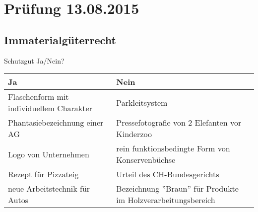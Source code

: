 \section{Prüfung 13.08.2015}

\subsection{Immaterialgüterrecht}
Schutzgut Ja/Nein?\\
\begin{tabular}{|l|l|}
	\hline 
	\textbf{Ja} & \textbf{Nein} \\ 
	\hline 
	Flaschenform mit individuellem Charakter & Parkleitsystem \\ 
	\hline 
	Phantasiebezeichnung einer AG & Pressefotografie von 2 Elefanten vor Kinderzoo \\
	\hline
	Logo von Unternehmen & rein funktionsbedingte Form von Konservenbüchse \\
	\hline
	Rezept für Pizzateig & Urteil des CH-Bundesgerichts \\
	\hline
	neue Arbeitstechnik für Autos & Bezeichnung ''Braun'' für Produkte im Holzverarbeitungsbereich \\
	\hline
\end{tabular}

